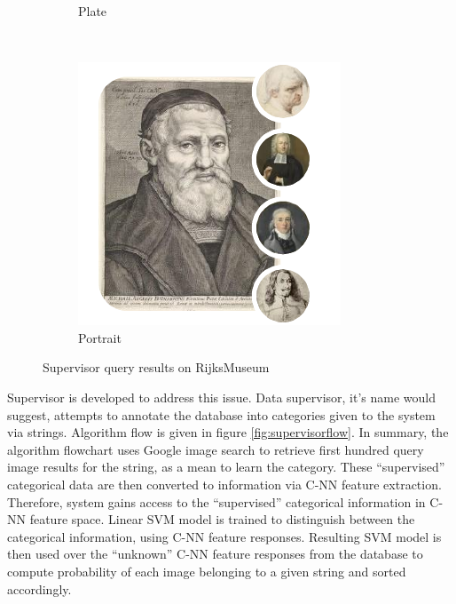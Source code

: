 \documentclass[runningheads]{llncs}
\begin{document}
\begin{figure}
\begin{subfigure}[b]{0.3\textwidth}
		\caption{Plate}
		\label{fig:plate}
	\end{subfigure}
	~ %
	\begin{subfigure}[b]{0.3\textwidth}
		\includegraphics[width=\textwidth]{figures/data_supervisor/portrait}
		\caption{Portrait}
		\label{fig:portrait}
	\end{subfigure}
	\caption{Supervisor query results on RijksMuseum}\label{fig-dsupervisor}
\end{figure}


Supervisor is developed to address this issue. Data supervisor, it's name would suggest, attempts to annotate the database into categories given to the system via strings. Algorithm flow is given in figure \ref{fig:supervisorflow}. In summary, the algorithm flowchart uses Google image search\cite{googleImage} to retrieve first hundred query image results for the string, as a mean to learn the category. These “supervised” categorical data are then converted to information via C-NN\cite{Chatfield14} feature extraction. Therefore, system gains access to the “supervised” categorical information in C-NN feature space. Linear SVM model\cite{CC01a} is trained to distinguish between the categorical information, using C-NN feature responses. Resulting SVM model is then used over the “unknown” C-NN feature responses from the database to compute probability of each image belonging to a given string and sorted accordingly.
\end{document}
